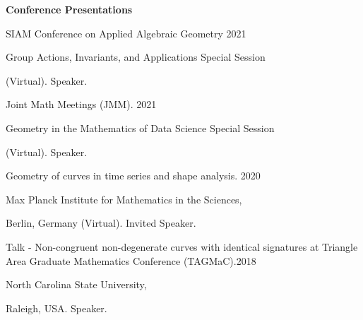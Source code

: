 \documentclass{article}
\begin{document}

%
%
\bigskip
\bigskip


\textsf{\textbf{\Large Conference Presentations} \hrulefill}

\medskip
SIAM Conference on Applied Algebraic Geometry \hfill 2021

Group Actions, Invariants, and Applications Special Session

(Virtual). Speaker.

\medskip
Joint Math Meetings (JMM). \hfill 2021

Geometry in the Mathematics of Data Science Special Session

(Virtual). Speaker.

\medskip
Geometry of curves in time series and shape analysis. \hfill 2020

Max Planck Institute for Mathematics in the Sciences,

Berlin, Germany (Virtual). Invited Speaker.





\medskip
Talk - Non-congruent non-degenerate curves with identical signatures at 
Triangle Area Graduate Mathematics Conference (TAGMaC).\hfill 2018

North Carolina State University,  

 Raleigh, USA. Speaker.
%
%
%

%
%
%
%
%
\end{document}
